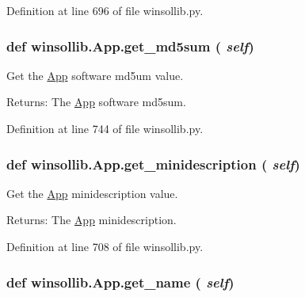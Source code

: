 Definition at line 696 of file winsollib.py.\hypertarget{classwinsollib_1_1App_8668edffb85d5c7cda670d16b3d1f761}{
\subsubsection[get\_\-md5sum]{\setlength{\rightskip}{0pt plus 5cm}def winsollib.App.get\_\-md5sum ( {\em self})}}
\label{classwinsollib_1_1App_8668edffb85d5c7cda670d16b3d1f761}


Get the \hyperlink{classwinsollib_1_1App}{App} software md5um value. 

\begin{Desc}
\item[Returns:]The \hyperlink{classwinsollib_1_1App}{App} software md5sum. \end{Desc}


Definition at line 744 of file winsollib.py.\hypertarget{classwinsollib_1_1App_62522ade216eaeb84231e4ddd5508dd1}{
\subsubsection[get\_\-minidescription]{\setlength{\rightskip}{0pt plus 5cm}def winsollib.App.get\_\-minidescription ( {\em self})}}
\label{classwinsollib_1_1App_62522ade216eaeb84231e4ddd5508dd1}


Get the \hyperlink{classwinsollib_1_1App}{App} minidescription value. 

\begin{Desc}
\item[Returns:]The \hyperlink{classwinsollib_1_1App}{App} minidescription. \end{Desc}


Definition at line 708 of file winsollib.py.\hypertarget{classwinsollib_1_1App_e8350e6e153e7acbe1dfb50b6b876512}{
\subsubsection[get\_\-name]{\setlength{\rightskip}{0pt plus 5cm}def winsollib.App.get\_\-name ( {\em self})}}
\label{classwinsollib_1_1App_e8350e6e153e7acbe1dfb50b6b876512}


